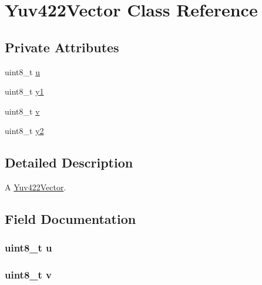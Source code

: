 \hypertarget{classUtility_1_1Yuv422Vector}{}\section{Yuv422\+Vector Class Reference}
\label{classUtility_1_1Yuv422Vector}
\subsection*{Private Attributes}
\begin{DoxyCompactItemize}
\item 
uint8\+\_\+t \hyperlink{classUtility_1_1Yuv422Vector_a02ae6f520370d7aaa739c73180f091b2}{u}
\item 
uint8\+\_\+t \hyperlink{classUtility_1_1Yuv422Vector_af2a4bde7e1b01cf2f420295ee22cf94f}{y1}
\item 
uint8\+\_\+t \hyperlink{classUtility_1_1Yuv422Vector_a467db8c58dd86cf7c97848f9fc85a4c8}{v}
\item 
uint8\+\_\+t \hyperlink{classUtility_1_1Yuv422Vector_ab46d53655890336d982ec8600a4c5f65}{y2}
\end{DoxyCompactItemize}


\subsection{Detailed Description}
A \hyperlink{classUtility_1_1Yuv422Vector}{Yuv422\+Vector}. 

\subsection{Field Documentation}
\hypertarget{classUtility_1_1Yuv422Vector_a02ae6f520370d7aaa739c73180f091b2}{}
\subsubsection[{u}]{\setlength{\rightskip}{0pt plus 5cm}uint8\+\_\+t u\hspace{0.3cm}{\ttfamily [private]}}\label{classUtility_1_1Yuv422Vector_a02ae6f520370d7aaa739c73180f091b2}
\hypertarget{classUtility_1_1Yuv422Vector_a467db8c58dd86cf7c97848f9fc85a4c8}{}
\subsubsection[{v}]{\setlength{\rightskip}{0pt plus 5cm}uint8\+\_\+t v\hspace{0.3cm}{\ttfamily [private]}}\label{classUtility_1_1Yuv422Vector_a467db8c58dd86cf7c97848f9fc85a4c8}
\hypertarget{classUtility_1_1Yuv422Vector_af2a4bde7e1b01cf2f420295ee22cf94f}{}

